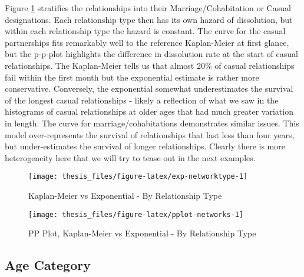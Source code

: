 \documentclass [11pt, proquest] {uwthesis}[2015/03/03]
\begin{document}
Figure \ref{fig:exp-networktype} stratifies the relationships into their Marriage/Cohabitation or Casual designations. Each relationship type then has its own hazard of dissolution, but within each relationship type the hazard is constant. The curve for the casual partnerships fits remarkably well to the reference Kaplan-Meier at first glance, but the p-p-plot highlights the difference in dissolution rate at the start of casual relationships. The Kaplan-Meier tells us that almost 20\% of casual relationships fail within the first month but the exponential estimate is rather more conservative. Conversely, the exponential somewhat underestimates the survival of the longest casual relationships - likely a reflection of what we saw in the histograms of casual relationships at older ages that had much greater variation in length. The curve for marriage/cohabitations demonstrates similar issues. This model over-represents the survival of relationships that last less than four years, but under-estimates the survival of longer relationships. Clearly there is more heterogeneity here that we will try to tease out in the next examples.
\begin{figure}

{\centering \texttt{[image: thesis\_files/figure-latex/exp-networktype-1]} 

}

\caption{Kaplan-Meier vs Exponential - By Relationship Type}\label{fig:exp-networktype}
\end{figure}
\begin{figure}

{\centering \texttt{[image: thesis\_files/figure-latex/pplot-networks-1]} 

}

\caption{PP Plot, Kaplan-Meier vs Exponential - By Relationship Type}\label{fig:pplot-networks}
\end{figure}
\hypertarget{age-category}{%
\subsection{Age Category}\label{age-category}}
\end{document}
